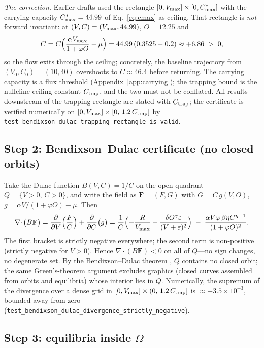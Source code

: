 \emph{The correction.} Earlier drafts used the rectangle
$[0,V_{\max}]\times[0,C^{*}_{\max}]$ with the carrying capacity $C^{*}_{\max}=44.99$ of
Eq.~\eqref{eq:cmax} as ceiling. That rectangle is \emph{not} forward
invariant: at $(V,C)=(V_{\max},44.99)$, $O=12.25$ and
\[
\dot C = C\Bigl(\frac{\alpha V_{\max}}{1+\varphi O}-\mu\Bigr)
       = 44.99\,(0.3525-0.2) \approx +6.86 \;>\;0 ,
\]
so the flow exits through the ceiling; concretely, the baseline trajectory
from $(V_0,C_0)=(10,40)$ overshoots to $C\approx46.4$ before returning.
The carrying capacity is a flux threshold (Appendix~\ref{app:carrying});
the trapping bound is the nullcline-ceiling constant $C_{\mathrm{trap}}$, and the two
must not be conflated. All results downstream of the trapping rectangle
are stated with $C_{\mathrm{trap}}$; the certificate is verified numerically on
$[0,V_{\max}]\times[0,\,1.2\,C_{\mathrm{trap}}]$ by
\texttt{test\_bendixson\_dulac\_trapping\_rectangle\_is\_valid}.

\subsection{Step 2: Bendixson--Dulac certificate (no closed orbits)}

Take the Dulac function $B(V,C)=1/C$ on the open quadrant
$Q=\{V>0,\,C>0\}$, and write the field as
$\mathbf{F}=(F,G)$ with $G=C\,g(V,O)$, $g=\alpha V/(1+\varphi O)-\mu$.
Then
\[
\nabla\!\cdot\!\bigl(B\mathbf{F}\bigr)
= \frac{\partial}{\partial V}\Bigl(\frac{F}{C}\Bigr)
+ \frac{\partial}{\partial C}\bigl(g\bigr)
= \frac{1}{C}\Bigl(
   -\frac{R}{V_{\max}}
   -\frac{\delta O^{\gamma}\varepsilon}{(V+\varepsilon)^{2}}
  \Bigr)
\;-\;
\frac{\alpha V\varphi\,\beta\eta C^{\eta-1}}{(1+\varphi O)^{2}} .
\]
The first bracket is strictly negative everywhere; the second term is
non-positive (strictly negative for $V>0$). Hence
$\nabla\!\cdot\!(B\mathbf{F})<0$ on all of $Q$---no sign changes, no
degenerate set. By the Bendixson--Dulac theorem
\citep{strogatz2015nonlinear}, $Q$ contains no closed orbit; the same
Green's-theorem argument excludes graphics (closed curves assembled from
orbits and equilibria) whose interior lies in $Q$. Numerically, the
supremum of the divergence over a dense grid in
$[0,V_{\max}]\times(0,\,1.2\,C_{\mathrm{trap}}]$ is $\approx-3.5\times10^{-3}$, bounded
away from zero
(\texttt{test\_bendixson\_dulac\_divergence\_strictly\_negative}).

\subsection{Step 3: equilibria inside $\Omega$}

